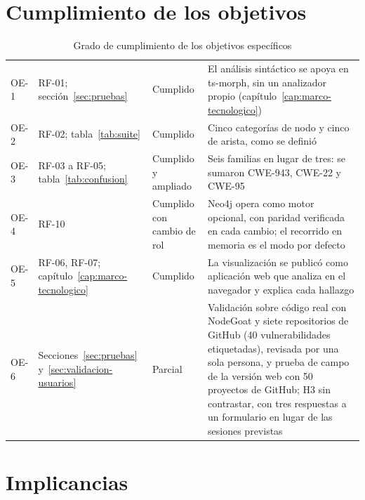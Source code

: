\section{Cumplimiento de los objetivos}\label{sec:cumplimiento}

\begin{table}[H]
    \centering
    \caption{Grado de cumplimiento de los objetivos específicos}
    \label{tab:cumplimiento}
    \small
    \begin{tabularx}{\textwidth}{l L l L}
        \toprule
         &  &  &  \\
        \midrule
        OE-1 & RF-01; sección~\ref{sec:pruebas} & Cumplido & El análisis sintáctico se apoya en ts-morph, sin un analizador propio (capítulo~\ref{cap:marco-tecnologico}) \\
        OE-2 & RF-02; tabla~\ref{tab:suite} & Cumplido & Cinco categorías de nodo y cinco de arista, como se definió \\
        OE-3 & RF-03 a RF-05; tabla~\ref{tab:confusion} & Cumplido y ampliado & Seis familias en lugar de tres: se sumaron CWE-943, CWE-22 y CWE-95 \\
        OE-4 & RF-10 & Cumplido con cambio de rol & Neo4j opera como motor opcional, con paridad verificada en cada cambio; el recorrido en memoria es el modo por defecto \\
        OE-5 & RF-06, RF-07; capítulo~\ref{cap:marco-tecnologico} & Cumplido & La visualización se publicó como aplicación web que analiza en el navegador y explica cada hallazgo \\
        OE-6 & Secciones~\ref{sec:pruebas} y~\ref{sec:validacion-usuarios} & Parcial & Validación sobre código real con NodeGoat y siete repositorios de GitHub (40 vulnerabilidades etiquetadas), revisada por una sola persona, y prueba de campo de la versión web con 50 proyectos de GitHub; H3 sin contrastar, con tres respuestas a un formulario en lugar de las sesiones previstas \\
        \bottomrule
    \end{tabularx}
\end{table}

\section{Implicancias}\label{sec:implicancias}

